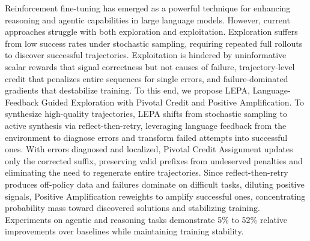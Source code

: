 Reinforcement fine-tuning has emerged as a powerful technique for enhancing reasoning and agentic capabilities in large language models. However, current approaches struggle with both exploration and exploitation. Exploration suffers from low success rates under stochastic sampling, requiring repeated full rollouts to discover successful trajectories. Exploitation is hindered by uninformative scalar rewards that signal correctness but not causes of failure, trajectory-level credit that penalizes entire sequences for single errors, and failure-dominated gradients that destabilize training. To this end, we propose LEPA, Language-Feedback Guided Exploration with Pivotal Credit and Positive Amplification. To synthesize high-quality trajectories, LEPA shifts from stochastic sampling to active synthesis via reflect-then-retry, leveraging language feedback from the environment to diagnose errors and transform failed attempts into successful ones. With errors diagnosed and localized, Pivotal Credit Assignment updates only the corrected suffix, preserving valid prefixes from undeserved penalties and eliminating the need to regenerate entire trajectories. Since reflect-then-retry produces off-policy data and failures dominate on difficult tasks, diluting positive signals, Positive Amplification reweights to amplify successful ones, concentrating probability mass toward discovered solutions and stabilizing training. Experiments on agentic and reasoning tasks demonstrate 5\% to 52\% relative improvements over baselines while maintaining training stability.
